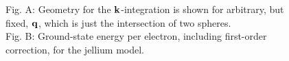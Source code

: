 \documentclass{homework}
\begin{document}
\begin{figure}
    \centering
    \qquad
    \caption{Fig. A: Geometry for the ${\bf k}$-integration is shown for arbitrary, but fixed, ${\bf q}$, which is just the intersection of two spheres. \\
    Fig. B: Ground-state energy per electron, including first-order correction, for the jellium model.}
    \label{figs:jellium}
\end{figure}
\end{document}
